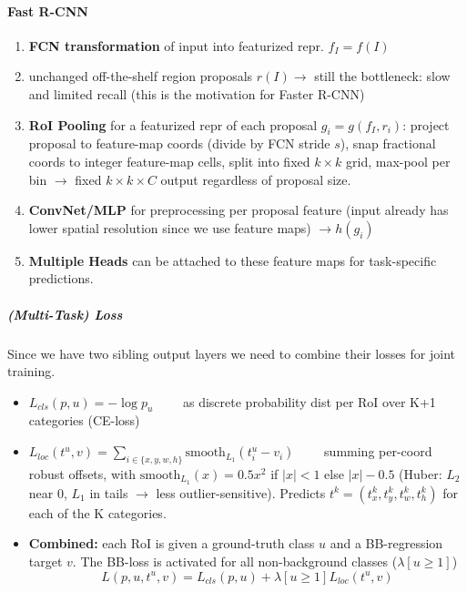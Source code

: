 \documentclass{article}
\begin{document}
\paragraph{Fast R-CNN}
\begin{enumerate}
    \item \textbf{FCN transformation} of input into featurized repr. $f_I = f(I)$
    \item unchanged off-the-shelf region proposals $r(I) \rightarrow$ still the bottleneck: slow and limited recall (this is the motivation for Faster R-CNN)
    \item \textbf{RoI Pooling} for a featurized repr of each proposal $g_i = g(f_I,r_i)$: project proposal to feature-map coords (divide by FCN stride $s$), snap fractional coords to integer feature-map cells, split into fixed $k\times k$ grid, max-pool per bin $\rightarrow$ fixed $k\times k\times C$ output regardless of proposal size.
    \item \textbf{ConvNet/MLP} for preprocessing per proposal feature (input already has lower spatial resolution since we use feature maps) $\rightarrow h(g_i)$
    \item \textbf{Multiple Heads} can be attached to these feature maps for task-specific predictions.
\end{enumerate}

\subparagraph{(Multi-Task) Loss}
Since we have two sibling output layers we need to combine their losses for joint training.
\begin{itemize}
    \item $L_{cls} (p,u) = - \log p_u \qquad$ as discrete probability dist per RoI over K+1 categories (CE-loss)
    \item $L_{loc}(t^u,v) = \sum_{i \in \{x,y,w,h\}} \mathrm{smooth}_{L_1}(t^u_i - v_i) \qquad$ summing per-coord robust offsets, with $\mathrm{smooth}_{L_1}(x) = 0.5 x^2$ if $|x|<1$ else $|x| - 0.5$ (Huber: $L_2$ near 0, $L_1$ in tails $\rightarrow$ less outlier-sensitive). Predicts $t^k = (t^k_x, t^k_y, t^k_w, t^k_h)$ for each of the K categories.
    \item \textbf{Combined:} each RoI is given a ground-truth class $u$ and a BB-regression target $v$. The BB-loss is activated for all non-background classes ($\lambda[u\geq 1]$)
    $$
    L(p,u,t^u,v)=L_{cls} (p,u)+\lambda[u\geq 1]L_{loc}(t^u,v)
    $$
\end{itemize}
\end{document}

